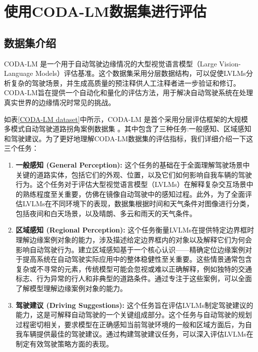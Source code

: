 \documentclass[
    linespread = 1.25
]{ctexart}
\begin{document}
\section{使用CODA-LM数据集进行评估}
\subsection{数据集介绍}
CODA-LM 是一个用于自动驾驶边缘情况的大型视觉语言模型（Large Vision-Language Models）评估基准。这个数据集采用分层数据结构，可以促使LVLMs分析复杂的驾驶场景，并生成高质量的预注释供人工注释者进一步验证和修订。CODA-LM旨在提供一个自动化和量化的评估方法，用于解决自动驾驶系统在处理真实世界的边缘情况时常见的挑战。

如表\ref{CODA-LM dataset}中所示，CODA-LM 是首个采用分层评估框架的大规模多模式自动驾驶道路拐角案例数据集 \cite{chen2024automatedevaluationlargevisionlanguage}。其中包含了三种任务:一般感知、区域感知和驾驶建议。为了更好地理解CODA-LM数据集的评估指标，我们详细介绍一下这三个任务：

\begin{enumerate}
  \item \textbf{一般感知 (General Perception):}
        这个任务的基础在于全面理解驾驶场景中关键的道路实体，包括它们的外观、位置，以及它们如何影响自我车辆的驾驶行为。这个任务对于评估大型视觉语言模型（LVLMs）在解释复杂交互场景中的熟练程度至关重要，仿佛在镜像自动驾驶中的感知过程。此外，为了全面评估LVLMs在不同环境下的表现，数据集根据时间和天气条件对图像进行分类，包括夜间和白天场景，以及晴朗、多云和雨天的天气条件。

  \item \textbf{区域感知 (Regional Perception):}
        这个任务衡量LVLMs在提供特定边界框时理解边缘案例对象的能力，涉及描述给定边界框内的对象以及解释它们为何会影响自动驾驶行为。建立区域感知基于一个核心认识——精确定位边缘案例对于提高系统在自动驾驶实际应用中的整体稳健性至关重要。这些情景通常包含复杂或不寻常的元素，传统模型可能会忽视或难以正确解释，例如独特的交通标志、行为异常的行人和非典型的道路条件。通过专注于这些案例，可以全面了解模型理解边缘案例对象的能力。

  \item \textbf{驾驶建议 (Driving Suggestions):}
        这个任务旨在评估LVLMs制定驾驶建议的能力，这是可解释自动驾驶的一个关键组成部分。这个任务与自动驾驶的规划过程密切相关，要求模型在正确感知当前驾驶环境的一般和区域方面后，为自我车辆提供最佳的驾驶建议。通过构建驾驶建议任务，可以深入评估LVLMs在制定有效驾驶策略方面的表现。
\end{enumerate}
\end{document}
